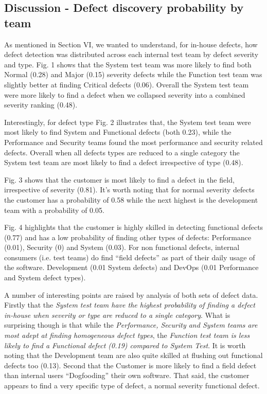 \subsection{Discussion - Defect discovery probability by team}

As mentioned in Section VI, we wanted to understand, for in-house defects, how defect detection was distributed across each internal test team by defect severity and type. Fig. 1 shows that the System test team was more likely to find both Normal (0.28) and Major (0.15) severity defects while the Function test team was slightly better at finding Critical defects (0.06). Overall the System test team were more likely to find a defect when we collapsed severity into a combined severity ranking (0.48). \par 

Interestingly, for defect type Fig. 2 illustrates that, the System test team were most likely to find System and 
Functional defects (both 0.23), while the Performance and Security teams found the most performance and security
related defects. Overall when all defects types are reduced to a single category the System test team are most likely to find a defect irrespective of type (0.48). \par

Fig. 3 shows that the customer is most likely to find a defect in the field, irrespective of severity (0.81). It's worth noting that for normal severity defects the customer has a probability of 0.58 while the next highest is the development team with a probability of 0.05.\par 

Fig. 4 highlights that the customer is highly skilled in detecting functional defects (0.77) and has a low probability
of finding other types of defects: Performance (0.01), Security (0) and System (0.03). For non functional defects, internal consumers (i.e. test teams) do find ``field defects'' as part of their daily usage of the software. Development (0.01 System defects) and DevOps (0.01 Performance and System defect types). \par 

A number of interesting points are raised by analysis of both sets of defect data. Firstly that the \emph{System test team have the highest probability of finding a defect in-house when severity or type are reduced to a single category}. What is surprising though is that while the \emph{Performance, Security and System teams are most adept at finding homogeneous defect types}, the \emph{Function test team is less likely to find a Functional defect (0.19) compared to System Test}. It is worth noting that the Development team are also quite skilled at flushing out functional defects too (0.13). Second that the Customer is more likely to find a field defect than internal users ``Dogfooding'' their own software. That said, the customer appears to find a very specific type of defect, a normal severity functional defect.  \par 

